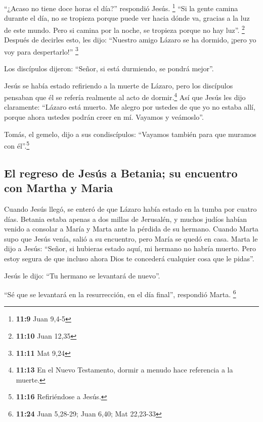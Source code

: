  ``¿Acaso no tiene doce horas el día?'' respondió Jesús.
\footnote{\textbf{11:9} Juan 9,4-5}  ``Si la gente camina
durante el día, no se tropieza porque puede ver hacia dónde va, gracias
a la luz de este mundo. Pero si camina por la noche, se tropieza porque
no hay luz''. \footnote{\textbf{11:10} Juan 12,35} 
Después de decirles esto, les dijo: ``Nuestro amigo Lázaro se ha
dormido, ¡pero yo voy para despertarlo!'' \footnote{\textbf{11:11} Mat
  9,24}

 Los discípulos dijeron: ``Señor, si está durmiendo, se
pondrá mejor''.

 Jesús se había estado refiriendo a la muerte de Lázaro,
pero los discípulos pensaban que él se refería realmente al acto de
dormir.\footnote{\textbf{11:13} En el Nuevo Testamento, dormir a menudo
  hace referencia a la muerte.}  Así que Jesús les dijo
claramente: ``Lázaro está muerto.  Me alegro por ustedes
de que yo no estaba allí, porque ahora ustedes podrán creer en mí.
Vayamos y veámoslo''.

 Tomás, el gemelo, dijo a sus condiscípulos: ``Vayamos
también para que muramos con él''.\footnote{\textbf{11:16} Refiriéndose
  a Jesús.}

\hypertarget{el-regreso-de-jesuxfas-a-betania-su-encuentro-con-martha-y-maria}{%
\subsection{El regreso de Jesús a Betania; su encuentro con Martha y
Maria}\label{el-regreso-de-jesuxfas-a-betania-su-encuentro-con-martha-y-maria}}

 Cuando Jesús llegó, se enteró de que Lázaro había estado
en la tumba por cuatro días.  Betania estaba apenas a dos
millas de Jerusalén,  y muchos judíos habían venido a
consolar a María y Marta ante la pérdida de su hermano. 
Cuando Marta supo que Jesús venía, salió a su encuentro, pero María se
quedó en casa.  Marta le dijo a Jesús: ``Señor, si
hubieras estado aquí, mi hermano no habría muerto.  Pero
estoy segura de que incluso ahora Dios te concederá cualquier cosa que
le pidas''.

 Jesús le dijo: ``Tu hermano se levantará de nuevo''.

 ``Sé que se levantará en la resurrección, en el día
final'', respondió Marta. \footnote{\textbf{11:24} Juan 5,28-29; Juan
  6,40; Mat 22,23-33}

